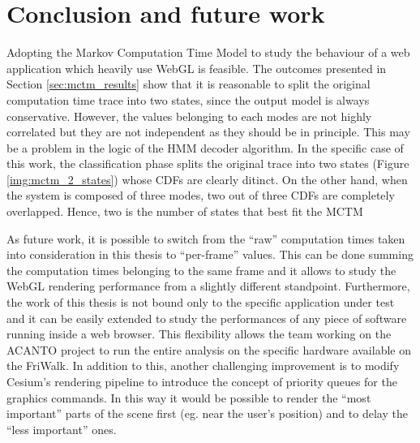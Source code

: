 \chapter{Conclusion and future work} \label{cha:conclusion}


Adopting the Markov Computation Time Model to study the behaviour of a web
application which heavily use WebGL is feasible.
The outcomes presented in Section \ref{sec:mctm_results} show that it is
reasonable to split the original computation time trace into two states, since
the output model is always conservative.
However, the values belonging to each modes are not highly correlated but they
are not independent as they should be in principle.
This may be a problem in the logic of the HMM decoder algorithm. In the specific
case of this work, the classification phase splits the original trace into two
states (Figure \ref{img:mctm_2_states}) whose CDFs are clearly ditinct. On the
other hand, when the system is composed of three modes, two out of three CDFs
are completely overlapped. Hence, two is the number of states that best fit the
MCTM

As future work, it is possible to switch from the ``raw'' computation times taken
into consideration in this thesis to ``per-frame'' values. This can be done
summing the computation times belonging to the same frame and it allows to study
the WebGL rendering performance from a slightly different standpoint.
Furthermore, the work of this thesis is not bound only to the specific
application under test and it can be easily extended to study the performances
of any piece of software running inside a web browser. This flexibility allows
the team working on the ACANTO project to run the entire analysis on the
specific hardware available on the FriWalk. In addition to this, another
challenging improvement is to modify Cesium's rendering pipeline to introduce
the concept of priority queues for the graphics commands. In this way it would
be possible to render the ``most important'' parts of the scene first (eg. near
the user's position) and to delay the ``less important'' ones.
